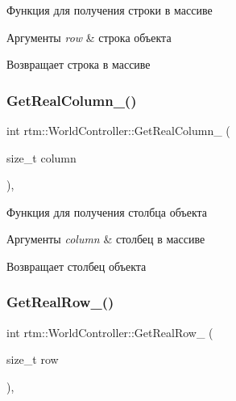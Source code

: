 Функция для получения строки в массиве 
\begin{DoxyParams}{Аргументы}
{\em row} & строка объекта \\
\hline
\end{DoxyParams}
\begin{DoxyReturn}{Возвращает}
строка в массиве 
\end{DoxyReturn}
\mbox{\label{classrtm_1_1_world_controller_a73f4df1b8493c6d6d0a6b3cdb21a076c}} 
\subsubsection{\texorpdfstring{Get\+Real\+Column\+\_\+()}{GetRealColumn\_()}}
{\footnotesize\ttfamily int rtm\+::\+World\+Controller\+::\+Get\+Real\+Column\+\_\+ (\begin{DoxyParamCaption}\item[{size\+\_\+t}]{column }\end{DoxyParamCaption})\hspace{0.3cm}{\ttfamily [inline]}, {\ttfamily [private]}}

Функция для получения столбца объекта 
\begin{DoxyParams}{Аргументы}
{\em column} & столбец в массиве \\
\hline
\end{DoxyParams}
\begin{DoxyReturn}{Возвращает}
столбец объекта 
\end{DoxyReturn}
\mbox{\label{classrtm_1_1_world_controller_a3aad7b071f3e8a80ab159e89ec5c8035}} 
\subsubsection{\texorpdfstring{Get\+Real\+Row\+\_\+()}{GetRealRow\_()}}
{\footnotesize\ttfamily int rtm\+::\+World\+Controller\+::\+Get\+Real\+Row\+\_\+ (\begin{DoxyParamCaption}\item[{size\+\_\+t}]{row }\end{DoxyParamCaption})\hspace{0.3cm}{\ttfamily [inline]}, {\ttfamily [private]}}

